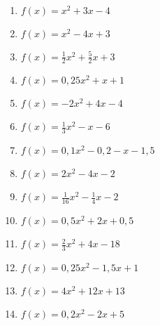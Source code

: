 \begin{Exercise}[title={Bestimme die Nullstellen}, label=normalformNullstellenA1]\\
	\begin{minipage}{\textwidth}
		\begin{minipage}{0.49\textwidth}
			\begin{enumerate}[label=\alph*)]
				\item \(f(x)=x^2+3x-4\)
				\item \(f(x)=x^2-4x+3\)
				\item \(f(x)=\frac{1}{2}x^2+\frac{5}{2}x+3\)
				\item \(f(x)=0,25x^2+x+1\)
				\item \(f(x)=-2x^2+4x-4\)
				\item \(f(x)=\frac{1}{3}x^2-x-6\)
				\item \(f(x)=0,1x^2-0,2-x-1,5\)
			\end{enumerate}
		\end{minipage}
		\begin{minipage}{0.49\textwidth}
			\begin{enumerate}[label=\alph*)]
				\setcounter{enumi}{7}
				\item \(f(x)=2x^2-4x-2\)
				\item \(f(x)=\frac{1}{16}x^2-\frac{1}{4}x-2\)
				\item \(f(x)=0,5x^2+2x+0,5\)
				\item \(f(x)=\frac{2}{3}x^2+4x-18\)
				\item \(f(x)=0,25x^2-1,5x+1\)
				\item \(f(x)=4x^2+12x+13\)
				\item \(f(x)=0,2x^2-2x+5\)
			\end{enumerate}
		\end{minipage}
	\end{minipage}
\end{Exercise}

